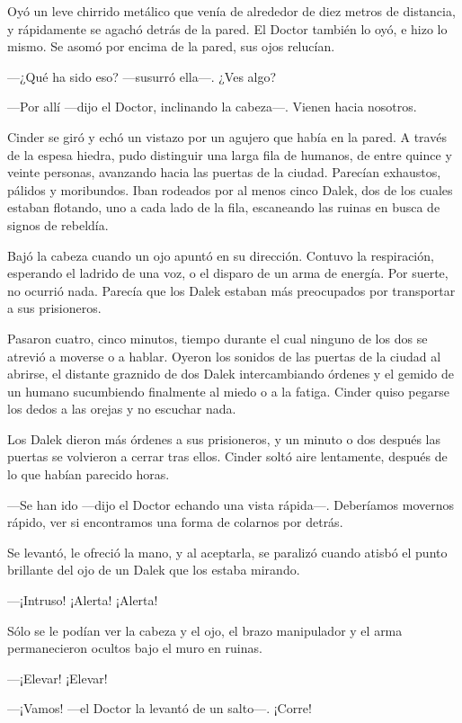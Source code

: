 Oyó un leve chirrido metálico que venía de alrededor de diez metros de distancia, y rápidamente se agachó detrás de la pared. El Doctor también lo oyó, e hizo lo mismo. Se asomó por encima de la pared, sus ojos relucían.

—¿Qué ha sido eso? —susurró ella—. ¿Ves algo?

—Por allí —dijo el Doctor, inclinando la cabeza—. Vienen hacia nosotros.

Cinder se giró y echó un vistazo por un agujero que había en la pared. A través de la espesa hiedra, pudo distinguir una larga fila de humanos, de entre quince y veinte personas, avanzando hacia las puertas de la ciudad. Parecían exhaustos, pálidos y moribundos. Iban rodeados por al menos cinco Dalek, dos de los cuales estaban flotando, uno a cada lado de la fila, escaneando las ruinas en busca de signos de rebeldía.

Bajó la cabeza cuando un ojo apuntó en su dirección. Contuvo la respiración, esperando el ladrido de una voz, o el disparo de un arma de energía. Por suerte, no ocurrió nada. Parecía que los Dalek estaban más preocupados por transportar a sus prisioneros.

Pasaron cuatro, cinco minutos, tiempo durante el cual ninguno de los dos se atrevió a moverse o a hablar. Oyeron los sonidos de las puertas de la ciudad al abrirse, el distante graznido de dos Dalek intercambiando órdenes y el gemido de un humano sucumbiendo finalmente al miedo o a la fatiga. Cinder quiso pegarse los dedos a las orejas y no escuchar nada.

Los Dalek dieron más órdenes a sus prisioneros, y un minuto o dos después las puertas se volvieron a cerrar tras ellos. Cinder soltó aire lentamente, después de lo que habían parecido horas.



—Se han ido —dijo el Doctor echando una vista rápida—. Deberíamos movernos rápido, ver si encontramos una forma de colarnos por detrás.

Se levantó, le ofreció la mano, y al aceptarla, se paralizó cuando atisbó el punto brillante del ojo de un Dalek que los estaba mirando.

—¡Intruso! ¡Alerta! ¡Alerta!

Sólo se le podían ver la cabeza y el ojo, el brazo manipulador y el arma permanecieron ocultos bajo el muro en ruinas.

—¡Elevar! ¡Elevar!

—¡Vamos! —el Doctor la levantó de un salto—. ¡Corre!

